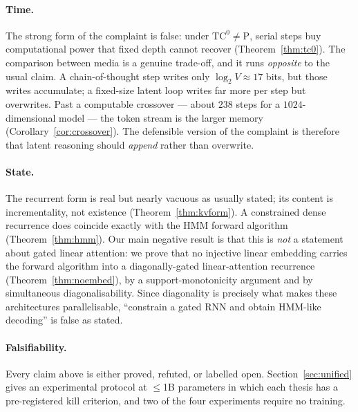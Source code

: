 \paragraph{Time.} The strong form of the complaint is false: under
$\mathrm{TC}^0 \ne \mathrm{P}$, serial steps buy computational power that fixed
depth cannot recover (Theorem~\ref{thm:tc0}). The comparison between media is a
genuine trade-off, and it runs \emph{opposite} to the usual claim. A
chain-of-thought step writes only $\log_2 V \approx 17$ bits, but those writes
accumulate; a fixed-size latent loop writes far more per step but overwrites. Past
a computable crossover --- about $238$ steps for a $1024$-dimensional model ---
the token stream is the larger memory (Corollary~\ref{cor:crossover}). The
defensible version of the complaint is therefore that latent reasoning should
\emph{append} rather than overwrite.

\paragraph{State.} The recurrent form is real but nearly vacuous as usually
stated; its content is incrementality, not existence (Theorem~\ref{thm:kvform}).
A constrained dense recurrence does coincide exactly with the HMM forward
algorithm (Theorem~\ref{thm:hmm}). Our main negative result is that this is
\emph{not} a statement about gated linear attention: we prove that no injective
linear embedding carries the forward algorithm into a diagonally-gated
linear-attention recurrence (Theorem~\ref{thm:noembed}), by a support-monotonicity
argument and by simultaneous diagonalisability. Since diagonality is precisely
what makes these architectures parallelisable, ``constrain a gated RNN and obtain
HMM-like decoding'' is false as stated.

\paragraph{Falsifiability.} Every claim above is either proved, refuted, or
labelled open. Section~\ref{sec:unified} gives an experimental protocol at
$\le$1B parameters in which each thesis has a pre-registered kill criterion, and
two of the four experiments require no training.
